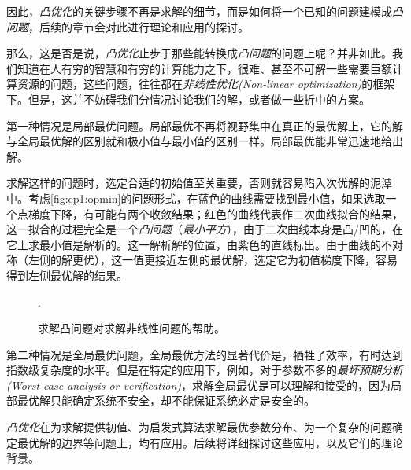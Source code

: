 因此，\emph{凸优化}的关键步骤不再是求解的细节，而是如何将一个已知的问题建模成\emph{凸问题}，后续的章节会对此进行理论和应用的探讨。

那么，这是否是说，\emph{凸优化}止步于那些能转换成\emph{凸问题}的问题上呢？并非如此。我们知道在人有穷的智慧和有穷的计算能力之下，很难、甚至不可解一些需要巨额计算资源的问题，这些问题，往往都在\emph{非线性优化(Non-linear optimization)}的框架下。但是，这并不妨碍我们分情况讨论我们的解，或者做一些折中的方案。

\begin{multicols}{2}
第一种情况是局部最优问题。局部最优不再将视野集中在真正的最优解上，它的解与全局最优解的区别就和极小值与最小值的区别一样。局部最优能非常迅速地给出解。

求解这样的问题时，选定合适的初始值至关重要，否则就容易陷入次优解的泥潭中。考虑\autoref{fig:cp1:opmin}的问题形式，在蓝色的曲线需要找到最小值，如果选取一个点梯度下降，有可能有两个收敛结果；红色的曲线代表作二次曲线拟合的结果，这一拟合的过程完全是一个\emph{凸问题}（\emph{最小平方}），由于二次曲线本身是凸/凹的，在它上求最小值是解析的。这一解析解的位置，由紫色的直线标出。由于曲线的不对称（左侧的解更优），这一值更接近左侧的最优解，选定它为初值梯度下降，容易得到左侧最优解的结果。

\begin{figure}[H]
	\centering
	\DeclareGraphicsExtensions.
	\caption{求解凸问题对求解非线性问题的帮助。}
	\label{fig:cp1:opmin}
\end{figure}
\end{multicols}

第二种情况是全局最优问题，全局最优方法的显著代价是，牺牲了效率，有时达到指数级复杂度的水平。但是在特定的应用下，例如，对于参数不多的\emph{最坏预期分析(Worst-case analysis or verification)}，求解全局最优是可以理解和接受的，因为局部最优解只能确定系统不安全，却不能保证系统必定是安全的。

\emph{凸优化}在为求解提供初值、为启发式算法求解最优参数分布、为一个复杂的问题确定最优解的边界等问题上，均有应用。后续将详细探讨这些应用，以及它们的理论背景。